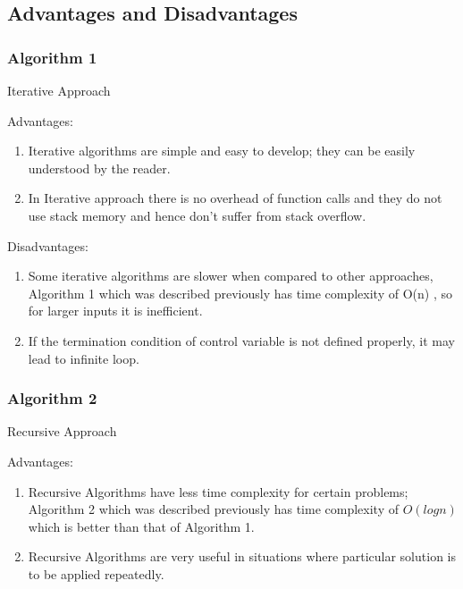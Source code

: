 \documentclass[12pt, a4paper]{article}
\begin{document}
\newpage

\subsection{Advantages and Disadvantages}



\subsubsection{Algorithm 1}
Iterative Approach

Advantages:
\begin{enumerate}
    \item {Iterative algorithms are simple and easy to develop; they can be easily understood by the reader.}
    \item {In Iterative approach there is no overhead of function calls and they do not use stack memory and hence don’t suffer from stack overflow.}
    
\end{enumerate}

Disadvantages:
\begin{enumerate}
    \item {Some iterative algorithms are slower when compared to other approaches, Algorithm 1 which was described previously has time complexity of O(n) , so for larger inputs it is inefficient.}
    \item {If the termination condition of control variable is not defined properly, it may lead to infinite loop.}
    
\end{enumerate}

\subsubsection{Algorithm 2}
Recursive Approach 

Advantages:
\begin{enumerate}
    \item {Recursive Algorithms have less time complexity for certain problems;  Algorithm 2 which was described previously has time complexity of $O(logn)$ which is better than that of Algorithm 1.}
    \item {Recursive Algorithms are very useful in situations where particular solution is to be applied repeatedly.}
    
\end{enumerate}
\end{document}

